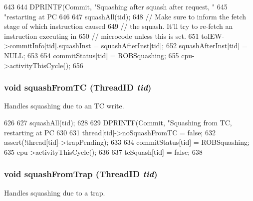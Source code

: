 \begin{DoxyCode}
643 {
644     DPRINTF(Commit, "Squashing after squash after request, "
645             "restarting at PC %
646 
647     squashAll(tid);
648     // Make sure to inform the fetch stage of which instruction caused
649     // the squash. It'll try to re-fetch an instruction executing in
650     // microcode unless this is set.
651     toIEW->commitInfo[tid].squashInst = squashAfterInst[tid];
652     squashAfterInst[tid] = NULL;
653 
654     commitStatus[tid] = ROBSquashing;
655     cpu->activityThisCycle();
656 }
\end{DoxyCode}
\hypertarget{classDefaultCommit_ac4c7a18be5c282d711310ffb7b6f82f7}{
\subsubsection[{squashFromTC}]{\setlength{\rightskip}{0pt plus 5cm}void squashFromTC ({\bf ThreadID} {\em tid})}}
\label{classDefaultCommit_ac4c7a18be5c282d711310ffb7b6f82f7}
Handles squashing due to an TC write. 


\begin{DoxyCode}
626 {
627     squashAll(tid);
628 
629     DPRINTF(Commit, "Squashing from TC, restarting at PC %
630 
631     thread[tid]->noSquashFromTC = false;
632     assert(!thread[tid]->trapPending);
633 
634     commitStatus[tid] = ROBSquashing;
635     cpu->activityThisCycle();
636 
637     tcSquash[tid] = false;
638 }
\end{DoxyCode}
\hypertarget{classDefaultCommit_a2f79a5e45c55f3cba92021d1a5ebaadf}{
\subsubsection[{squashFromTrap}]{\setlength{\rightskip}{0pt plus 5cm}void squashFromTrap ({\bf ThreadID} {\em tid})}}
\label{classDefaultCommit_a2f79a5e45c55f3cba92021d1a5ebaadf}
Handles squashing due to a trap. 



